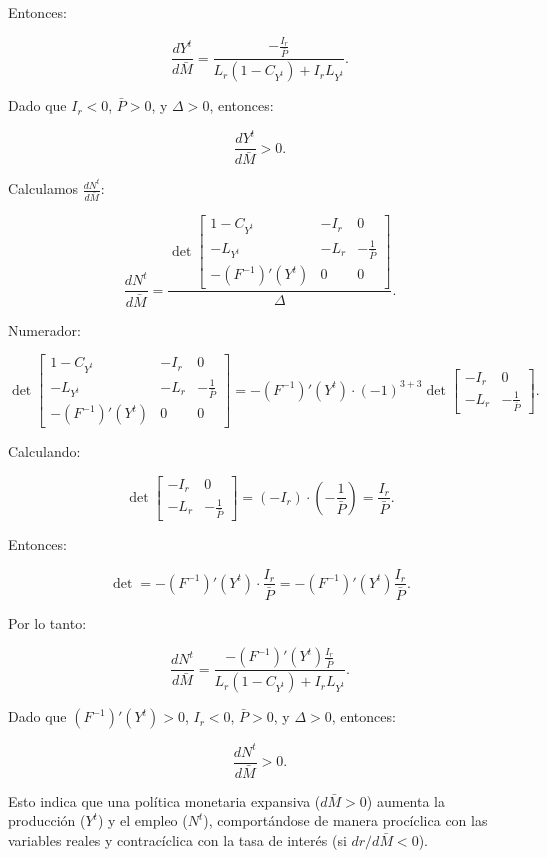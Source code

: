 \documentclass[
  doc,
  floatsintext,
  longtable,
  a4paper,
  nolmodern,
  notxfonts,
  notimes,
  colorlinks=true,linkcolor=blue,citecolor=blue,urlcolor=blue]{apa7}
\begin{document}
\begin{enumerate}
  Entonces:

  \[
  \frac{dY^t}{d\bar{M}} = \frac{-\frac{I_r}{\bar{P}}}{L_r (1 - C_{Y^t}) + I_r L_{Y^t}}.
  \]

  Dado que \(I_r < 0\), \(\bar{P} > 0\), y \(\Delta > 0\), entonces:

  \[
  \frac{dY^t}{d\bar{M}} > 0.
  \]

  Calculamos \(\frac{dN^t}{d\bar{M}}\):

  \[
  \frac{dN^t}{d\bar{M}} = \frac{\det \begin{bmatrix}
  1 - C_{Y^t} & -I_r & 0 \\
  -L_{Y^t} & -L_r & -\frac{1}{\bar{P}} \\
  -(F^{-1})'(Y^t) & 0 & 0
  \end{bmatrix}}{\Delta}.
  \]

  Numerador:

  \[
  \det \begin{bmatrix}
  1 - C_{Y^t} & -I_r & 0 \\
  -L_{Y^t} & -L_r & -\frac{1}{\bar{P}} \\
  -(F^{-1})'(Y^t) & 0 & 0
  \end{bmatrix} = -(F^{-1})'(Y^t) \cdot (-1)^{3+3} \det \begin{bmatrix}
  -I_r & 0 \\
  -L_r & -\frac{1}{\bar{P}}
  \end{bmatrix}.
  \]

  Calculando:

  \[
  \det \begin{bmatrix}
  -I_r & 0 \\
  -L_r & -\frac{1}{\bar{P}}
  \end{bmatrix} = (-I_r) \cdot \left(-\frac{1}{\bar{P}}\right) = \frac{I_r}{\bar{P}}.
  \]

  Entonces:

  \[
  \det = -(F^{-1})'(Y^t) \cdot \frac{I_r}{\bar{P}} = -(F^{-1})'(Y^t) \frac{I_r}{\bar{P}}.
  \]

  Por lo tanto:

  \[
  \frac{dN^t}{d\bar{M}} = \frac{-(F^{-1})'(Y^t) \frac{I_r}{\bar{P}}}{L_r (1 - C_{Y^t}) + I_r L_{Y^t}}.
  \]

  Dado que \((F^{-1})'(Y^t) > 0\), \(I_r < 0\), \(\bar{P} > 0\), y
  \(\Delta > 0\), entonces:

  \[
  \frac{dN^t}{d\bar{M}} > 0.
  \]

  Esto indica que una política monetaria expansiva (\(d\bar{M} > 0\))
  aumenta la producción (\(Y^t\)) y el empleo (\(N^t\)), comportándose
  de manera procíclica con las variables reales y contracíclica con la
  tasa de interés (si \(dr/d\bar{M} < 0\)).
\end{enumerate}
\end{document}
